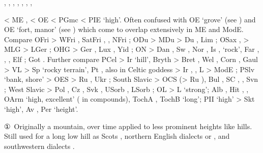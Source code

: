 \documentclass[12pt,letterpaper,oneside,article,draft]{memoir}
\begin{document}
\begin{Lemma}
\begin{Also}
, , , , , , , 
\end{Also}
\begin{Etymology}
	< ME ,  < OE  < PGmc  < PIE  ‘high’.
	Often confused with OE  ‘grove’ (see ) and OE  ‘fort, manor’
		(see ) which come to overlap extensively in ME and ModE.
	Compare
	OFri  > WFri , SatFri , , NFri ;
	ODu  > MDu  > Du , Lim ;
	OSax ,  > MLG  > LGer ;
	OHG  > Ger , Lux , Yid  ;
	ON  > Dan , Sw , Nor , Is ,  ‘rock’, 
		Far , , , Elf ;
	Got  .
	Further compare
	PCel  > Ir  ‘hill’, Bryth  > Bret , Wel , Corn ,
		Gaul  > VL  > Sp  ‘rocky terrain’, Pt ,
		also in Celtic goddess  > Ir , , L 
		> ModE ;
	PSlv  ‘bank, shore’ > 
		OES   > Ru  ,
			Ukr  ;
		South Slavic  > OCS   (> Ru  ), 
			Bul  , SC  ,  ,
			Svn ;
		West Slavic  > Pol , Cz , Svk ,
			USorb , LSorb ;
	OL  > L  ‘strong’;
	Alb , Hit  ,  ,
		OArm   ‘high, excellent’ (  in compounds),
		TochA , TochB  ‘long’;
	 PII  ‘high’ > Skt   ‘high’, Av  ,
	 	Per   ‘height’.
\end{Etymology}
\begin{Definitions}
	①~Originally a mountain, over time applied to less prominent heights like hills. Still used for a long low hill as Scots , northern English dialects  or , and southwestern dialects .

\end{Definitions}
\end{Lemma}
\end{document}
